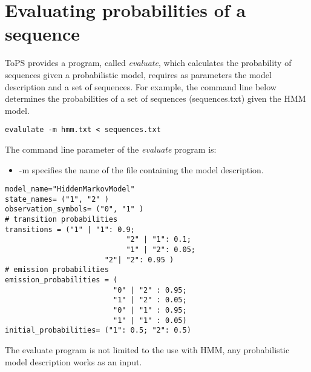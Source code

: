 \chapter{Evaluating probabilities of a sequence}

ToPS provides a program, called  \textit{evaluate}, which calculates the probability of sequences given a probabilistic model,  requires as parameters the model description and a set of sequences. For example, the command line below determines the probabilities of a set of sequences (sequences.txt) given the HMM model.


\begin{Verbatim}[frame=single, label={Command line}]
evalulate -m hmm.txt < sequences.txt
\end{Verbatim}

The command line parameter of the \textit{evaluate} program is:
\begin{itemize}
\item -m specifies the name of the file containing the model description.
\end{itemize}

\begin{Verbatim}[frame=single, label={hmm.txt}]
model_name="HiddenMarkovModel"
state_names= ("1", "2" )
observation_symbols= ("0", "1" )
# transition probabilities
transitions = ("1" | "1": 0.9;
                            "2" | "1": 0.1;
                            "1" | "2": 0.05;
                       "2"| "2": 0.95 )
# emission probabilities
emission_probabilities = (
                         "0" | "2" : 0.95; 
                         "1" | "2" : 0.05;            
                         "0" | "1" : 0.95; 
                         "1" | "1" : 0.05)
initial_probabilities= ("1": 0.5; "2": 0.5)
\end{Verbatim}

The evaluate program is not limited to the use with HMM, any probabilistic model description works as an input. 



